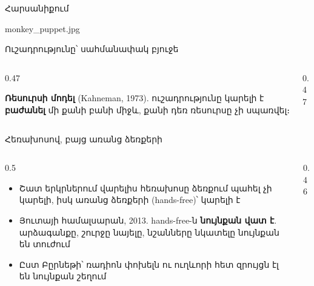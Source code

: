 \begin{frame}{Հարսանիքում}
  \centering
  \begin{meme}[6.9cm]{monkey_puppet.jpg}
  \end{meme}
\end{frame}

\begin{frame}{Ուշադրությունը՝ սահմանափակ բյուջե}
  \centering
  \par\smallskip
  \begin{columns}[T]
    \begin{column}{0.47\textwidth}
      \begin{card}[colback=lavender!35!cardwhite]
        \small\textbf{Ռեսուրսի մոդել} (Kahneman, 1973). ուշադրությունը կարելի է \textbf{բաժանել} մի քանի բանի միջև, քանի դեռ ռեսուրսը չի սպառվել։
      \end{card}
    \end{column}
    \begin{column}{0.47\textwidth}
    \end{column}
  \end{columns}
\end{frame}

\begin{frame}{Հեռախոսով, բայց առանց ձեռքերի}
  \begin{columns}[c]
    \begin{column}{0.5\textwidth}
      \begin{itemize}
        \item Շատ երկրներում վարելիս հեռախոսը ձեռքում պահել չի կարելի, իսկ առանց ձեռքերի (hands-free)՝ կարելի է
        \item<2-> Յուտայի համալսարան, 2013. hands-free-ն \textbf{նույնքան վատ է}. արձագանքը, շուրջը նայելը, նշանները նկատելը նույնքան են տուժում
        \item<3-> Ըստ Բըրնեթի՝ ռադիոն փոխելն ու ուղևորի հետ զրույցն էլ են նույնքան շեղում
      \end{itemize}
    \end{column}
    \begin{column}{0.46\textwidth}
      \centering
    \end{column}
  \end{columns}
\end{frame}

